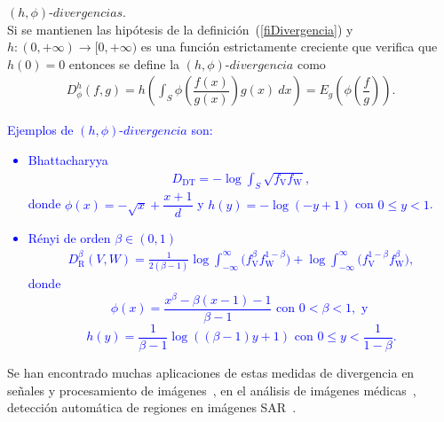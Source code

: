 \begin{definition} $\left(h,\phi\right) \text{-} divergencias$.\\
	\label{hfiDivergencia}
	Si se mantienen las hipótesis de la definición~(\ref{fiDivergencia}) y $h: (0,+\infty)\longrightarrow [0,+\infty)$ es una función estrictamente creciente que verifica que $h(0)=0$ entonces se define la $\left(h,\phi\right) \text{-} divergencia$ como
	\begin{align}
	D^h_{\phi}(f, g)=h\left(\int_{S} \phi\left(\dfrac{f(x)}{g(x)}\right) g(x) \ dx\right)=E_{g}\left(\phi\left(\dfrac{f}{g}\right)\right).
	\end{align}
\end{definition}
\textcolor{blue}{	
\begin{example} Ejemplos de $\left(h,\phi\right) \text{-} divergencia$ son:
	\begin{itemize}
		\item Bhattacharyya 
		\begin{align}
		\label{triangular}
		D_{\text{DT}}=-\log \displaystyle \int_{S} \sqrt{f_\text{V}f_\text{W}},
		\end{align}
		donde $\phi(x)=-\sqrt{x}+\dfrac{x+1}{d}$ y $h(y)=-\log(-y+1)$ con $0\leq y<1$.
		\item R\'enyi de orden $\beta\in(0,1)$ 
		\begin{align}
		D_\text{R}^{\beta}(V,W)=\frac{1}{2(\beta-1)}\log\int_{-\infty}^{\infty}\big({f_\text{V}^{\beta}f_\text{W}^{1-\beta})+\log\int_{-\infty}^{\infty}\big(f_\text{V}^{1-\beta}f_\text{W}^{\beta}}\big),
		\end{align}
		donde 
		$$\phi(x)=\dfrac{x^{\beta}-\beta(x-1)-1}{\beta-1} \text{ con } 0 < \beta < 1, \text{ y }$$  
		$$h(y)=\dfrac{1}{\beta-1}\log((\beta-1)y+1) \text{ con } 0\leq y<\dfrac{1}{1-\beta}.$$
	\end{itemize}
\end{example}
}		
Se han encontrado muchas aplicaciones de estas medidas de divergencia en señales y procesamiento de imágenes~\cite{4218961}, en el análisis de imágenes médicas~\cite{5599869}, detección automática de regiones en imágenes SAR~\cite{ClassificationPolSARSegmentsMinimizationWishartDistances,EdgeDetectionDistancesEntropiesJSTARS,SARSegmentationLevelSetGA0}. 


